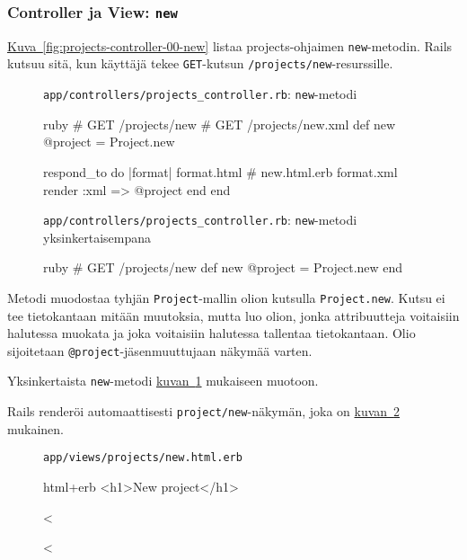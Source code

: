 \documentclass{article}
\newenvironment{myfigure}[1][tbp]{
  \begin{figure}[#1]
    \centering
    \begin{lrbox}{\myfigurebox}
      \begin{minipage}{\textwidth}
}{
      \end{minipage}
    \end{lrbox}
    \colorbox{blue!4}{\usebox{\myfigurebox}}
  \end{figure}
}
\newcommand{\myref}[2]{\hyperref[#2]{#1~\ref*{#2}}}
\newcommand{\pdfforeignlanguage}[2]{\texorpdfstring{\foreignlanguage{#1}{#2}}{#2}}
\newcommand{\eng}[1]{\pdfforeignlanguage{english}{#1}}
\begin{document}
\subsubsection{\eng{Controller} ja \eng{View}: \texttt{new}}

\begin{samepage}
\myref{Kuva}{fig:projects-controller-00-new} listaa projects-ohjaimen
\texttt{new}-metodin. Rails kutsuu sitä, kun käyttäjä tekee \texttt{GET}-kutsun
\texttt{/projects/new}-resurssille.

\begin{myfigure}[H]
\caption{\texttt{app/controllers/projects\_controller.rb}: \texttt{new}-metodi}
\label{fig:projects-controller-00-new}

\begin{pygmented}{ruby}
  # GET /projects/new
  # GET /projects/new.xml
  def new
    @project = Project.new

    respond_to do |format|
      format.html # new.html.erb
      format.xml  { render :xml => @project }
    end
  end
\end{pygmented}

\caption{\texttt{app/controllers/projects\_controller.rb}: \texttt{new}-metodi
yksinkertaisempana}
\label{fig:projects-controller-01-new}

\begin{pygmented}{ruby}
  # GET /projects/new
  def new
    @project = Project.new
  end
\end{pygmented}
\end{myfigure}
\end{samepage}

Metodi muodostaa tyhjän \texttt{Project}-mallin olion kutsulla
\texttt{Project.new}. Kutsu ei tee tietokantaan mitään muutoksia, mutta luo
olion, jonka attribuutteja voitaisiin halutessa muokata ja joka voitaisiin
halutessa tallentaa tietokantaan. Olio sijoitetaan
\texttt{@project}-jäsenmuuttujaan näkymää varten.

Yksinkertaista \texttt{new}-metodi
\myref{kuvan}{fig:projects-controller-01-new} mukaiseen muotoon.

\begin{samepage}
Rails renderöi automaattisesti \texttt{project/new}-näkymän, joka on
\myref{kuvan}{fig:projects-new-view-00} mukainen.

\begin{myfigure}[H]
\caption{\texttt{app/views/projects/new.html.erb}}
\label{fig:projects-new-view-00}

\begin{pygmented}{html+erb}
<h1>New project</h1>

<%

<%
\end{pygmented}
\end{myfigure}
\end{samepage}
\end{document}
